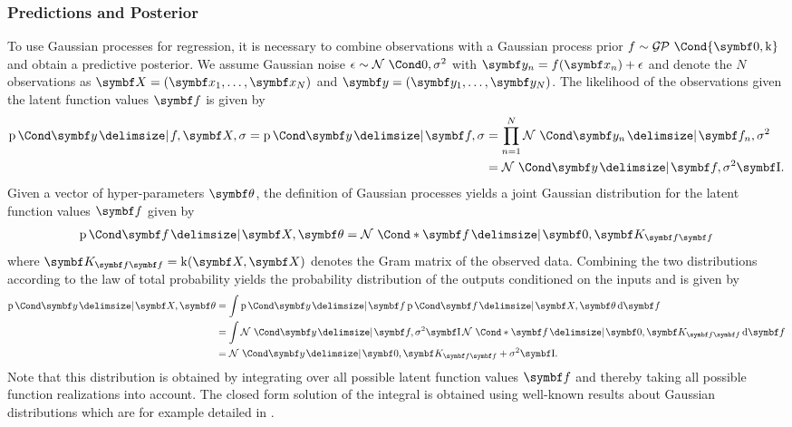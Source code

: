 \subsubsection{Predictions and Posterior}
To use Gaussian processes for regression, it is necessary to combine observations with a Gaussian process prior $f \sim \GP\Cond{\mat{0}, \K}$ and obtain a predictive posterior.
We assume Gaussian noise $\epsilon \sim \Gaussian{0, \sigma^2}$ with $\mat{y}_n = f(\mat{x}_n) + \epsilon$ and denote the $N$ observations as $\mat{X} = (\mat{x}_1, \dots, \mat{x}_N)$ and $\mat{y} = (\mat{y}_1, \dots, \mat{y}_N)$.
The likelihood of the observations given the latent function values $\mat{f}$ is given by
\begin{align}
    \begin{split}
        \Prob{\mat{y} \given f, \mat{X}, \sigma}
        = \Prob{\mat{y} \given \mat{f}, \sigma}
        &= \prod_{n = 1}^N \Gaussian{\mat{y}_n \given \mat{f}_n, \sigma^2} \\
        &= \Gaussian{\mat{y} \given \mat{f}, \sigma^2 \Eye}.
    \end{split}
\end{align}
Given a vector of hyper-parameters $\mat{\theta}$, the definition of Gaussian processes yields a joint Gaussian distribution for the latent function values $\mat{f}$ given by
\begin{align}
    \Prob{\mat{f} \given \mat{X}, \mat{\theta}} = \Gaussian*{\mat{f} \given \mat{0}, \mat{K}_{\mat{f}\mat{f}}}
\end{align}
where $\mat{K}_{\mat{f}\mat{f}} = \K(\mat{X}, \mat{X})$ denotes the Gram matrix of the observed data.
Combining the two distributions according to the law of total probability yields the probability distribution of the outputs conditioned on the inputs and is given by
\begin{align}
    \begin{split}
        \label{eq:gp:gp_marginal_likelihood}
        \Prob{\mat{y} \given \mat{X}, \mat{\theta}} &= \int \Prob{\mat{y} \given \mat{f}} \Prob{\mat{f} \given \mat{X}, \mat{\theta}} \diff \mat{f} \\
        &= \int \Gaussian{\mat{y} \given \mat{f}, \sigma^2 \Eye} \Gaussian*{\mat{f} \given \mat{0}, \mat{K}_{\mat{f}\mat{f}}} \diff \mat{f} \\
        &= \Gaussian{\mat{y} \given \mat{0}, \mat{K}_{\mat{f}\mat{f}} + \sigma^2 \Eye}.
    \end{split}
\end{align}
Note that this distribution is obtained by integrating over all possible latent function values $\mat{f}$ and thereby taking all possible function realizations into account.
The closed form solution of the integral is obtained using well-known results about Gaussian distributions which are for example detailed in \cite{petersen_matrix_2008}.

